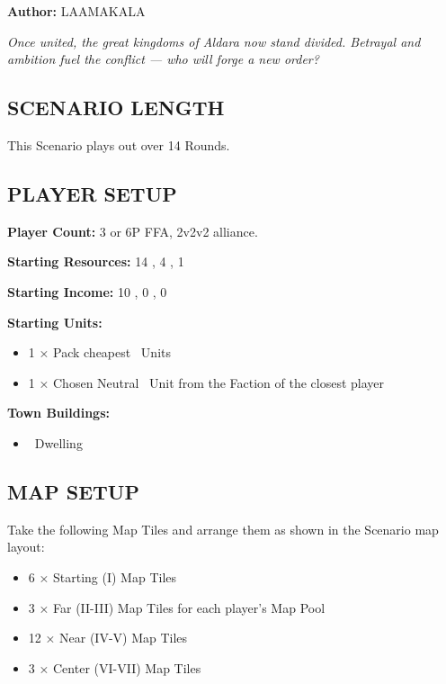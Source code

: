 
\begin{multicols*}{2}

\textbf{Author:} LAAMAKALA

\textit{Once united, the great kingdoms of Aldara now stand divided. Betrayal and ambition fuel the conflict — who will forge a new order?}  %

\subsection*{\MakeUppercase{Scenario Length}}
This Scenario plays out over 14 Rounds.

\subsection*{\MakeUppercase{Player Setup}}
\textbf{Player Count:} 3 or 6P FFA, 2v2v2 alliance.

\textbf{Starting Resources:} 14 , 4 , 1 

\textbf{Starting Income:} 10 , 0 , 0 

\textbf{Starting Units:}

\begin{itemize}
  \item 1 × Pack cheapest \bronze\ Units
  \item 1 × Chosen Neutral \bronze\ Unit from the Faction of the closest player
\end{itemize}

\textbf{Town Buildings:}
\begin{itemize}
  \item \bronze\ Dwelling
\end{itemize}

\subsection*{\MakeUppercase{Map Setup}}
Take the following Map Tiles and arrange them as shown in the Scenario map layout:

\begin{itemize}
  \item 6 × Starting (I) Map Tiles
  \item 3 × Far (II-III) Map Tiles for each player's Map Pool
  \item 12 × Near (IV-V) Map Tiles
  \item 3 × Center (VI-VII) Map Tiles
\end{itemize}


\end{multicols*}
